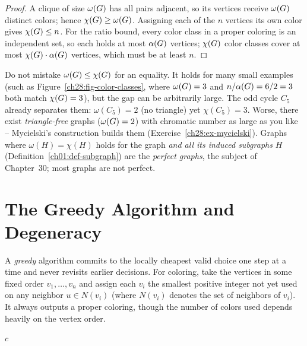 \begin{proof}
A clique of size $\omega(G)$ has all pairs adjacent, so its vertices receive
$\omega(G)$ distinct colors; hence $\chi(G)\ge\omega(G)$. Assigning each of the $n$ vertices its own color gives $\chi(G)\le n$. For the ratio bound, every color
class in a proper coloring is an independent set, so each holds at most $\alpha(G)$ vertices; $\chi(G)$ color classes cover
at most $\chi(G)\cdot\alpha(G)$ vertices, which must be at least $n$.
\end{proof}

\begin{trapbox}
Do not mistake $\omega(G)\le\chi(G)$ for an equality. It holds for many small examples (such as Figure~\ref{ch28:fig-color-classes}, where $\omega(G)=3$ and $n/\alpha(G)=6/2=3$ both match $\chi(G)=3$), but the gap can be arbitrarily large. The odd
cycle $C_5$ already separates them: $\omega(C_5)=2$ (no triangle) yet $\chi(C_5)=3$.
Worse, there exist \emph{triangle-free} graphs ($\omega(G)=2$) with chromatic number
as large as you like -- Mycielski's construction builds them (Exercise~\ref{ch28:ex-mycielski}). Graphs where
$\omega(H)=\chi(H)$ holds for the graph \emph{and all its induced subgraphs} $H$ (Definition~\ref{ch01:def-subgraph}) are the \emph{perfect graphs}, the subject of Chapter~30; most graphs are not
perfect.
\end{trapbox}

\section{The Greedy Algorithm and Degeneracy}
\label{ch28:greedy}

A \emph{greedy} algorithm commits to the locally cheapest valid choice one step at a time and never revisits earlier decisions. For coloring, take the vertices in some fixed order $v_1,\dots,v_n$ and assign each $v_i$ the smallest positive integer not yet used on any neighbor $u\in N(v_i)$ (where $N(v_i)$ denotes the set of neighbors of $v_i$). It always outputs a proper coloring, though the number of colors used depends heavily on the vertex order.

\begin{algorithm}[H]
\caption{\textsc{GreedyColor}$(\Gph, \pi)$ -- greedy coloring in a fixed order}
\label{ch28:alg-greedy}
\Return $c$\;
\end{algorithm}

